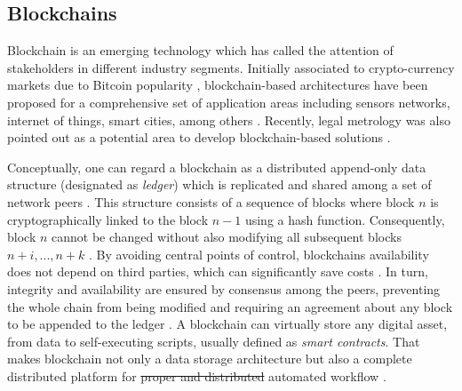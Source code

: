 \documentclass[sigplan]{acmart}
\providecommand{\DIFdel}[1]{{\protect\color{red}\sout{#1}}}                      %
\providecommand{\DIFdelbegin}{} %
\providecommand{\DIFdelend}{} %
\begin{document}
\subsection{Blockchains}
Blockchain is an emerging technology which has called the attention of stakeholders in different industry segments. 
Initially associated to crypto-currency markets due to Bitcoin popularity \cite{Zheng2017}, blockchain-based architectures have been proposed for a comprehensive set of application areas including sensors networks, internet of things, smart cities, among others \cite{Zheng2017,Androulaki2018}.
Recently, legal metrology was also pointed out as a potential area to develop blockchain-based solutions \cite{Peters2018,MeloJr.2019}.

Conceptually, one can regard a blockchain as a distributed append-only data structure (designated as \emph{ledger}) which is replicated and shared among a set of network peers \cite{Christidis2016}. 
This structure consists of a sequence of blocks where block $n$ is cryptographically linked to the block $n-1$ using a hash function. 
Consequently, block $n$ cannot be changed without also modifying all subsequent blocks $n + i, ..., n + k$ \cite{Sousa2018}. 
By avoiding central points of control, blockchains availability does not depend on third parties, which can significantly save costs \cite{Zheng2017}.
In turn, integrity and availability are ensured by consensus among the peers, preventing the whole chain from being modified and requiring an agreement about any block to be appended to the ledger \cite{Sousa2018,Vukolic2016}. 
A blockchain can virtually store any digital asset, from data to self-executing scripts, usually defined as \emph{smart contracts}. 
That makes blockchain not only a data storage architecture but also a complete distributed platform for \DIFdelbegin \DIFdel{proper and distributed }\DIFdelend automated workflow \cite{Christidis2016}. 
\end{document}
